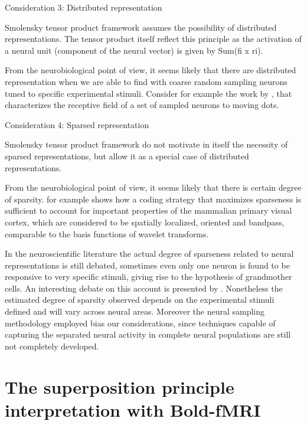 Consideration 3: Distributed representation

Smolensky tensor product framework assumes the possibility of distributed representations. The tensor product itself reflect this principle as the activation of a neural unit (component of the neural vector) is given by Sum(fi x ri).

From the neurobiological point of view, it seems likely that there are distributed representation when we are able to find with coarse random sampling neurons tuned to specific experimental stimuli. Consider for example the work by \citep{allman_stimulus_1985}, that characterizes the receptive field of a set of sampled neurons to moving dots.

Consideration 4: Sparsed representation

Smolensky tensor product framework do not motivate in itself the necessity of sparsed representations, but allow it as a special case of distributed representations.

From the neurobiological point of view, it seems likely that there is certain degree of sparsity. \citep{olshausen_emergence_1996} for example shows how a coding strategy that maximizes sparseness is sufficient to account for important properties of the mammalian primary visual cortex, which are considered to be spatially localized, oriented and bandpass, comparable to the basis functions of wavelet transforms.

In the neuroscientific literature the actual degree of sparseness related to neural representations is still debated, sometimes even only one neuron is found to be responsive to very specific stimuli, giving rise to the hypothesis of grandmother cells. An interesting debate on this account is presented by \citep{bowers_biological_2009}. Nonetheless the estimated degree of sparsity observed depends on the experimental stimuli defined and will vary across neural areas. Moreover the neural sampling methodology employed bias our considerations, since techniques capable of capturing the separated neural activity in complete neural populations are still not completely developed.




\section{The superposition principle interpretation with Bold-fMRI}


